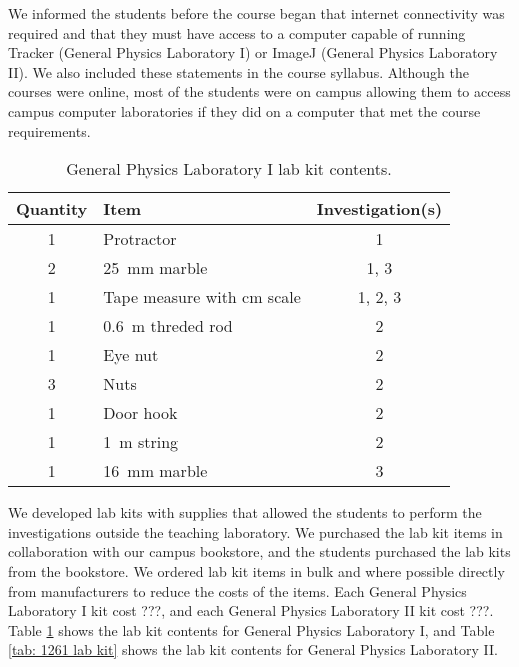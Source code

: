 \documentclass[aip, numerical, preprint]{revtex4-2}
\begin{document}
We informed the students before the course began that internet connectivity was required and that they must have access to a computer capable of running Tracker (General Physics Laboratory I) or ImageJ (General Physics Laboratory II). We also included these statements in the course syllabus. Although the courses were online, most of the students were on campus allowing them to access campus computer laboratories if they did on a computer that met the course requirements.
  
 \begin{table}
    \caption{\label{tab: 1251 lab kit} General Physics Laboratory I lab kit contents.}
        \begin{tabular}{clc}
            \hline\hline
            Quantity & Item & Investigation(s)\\
            \hline
            1 & Protractor & 1 \\
            2 & \SI{25}{mm} marble & 1, 3 \\
            1 & Tape measure with cm scale & 1, 2, 3\\
            1 & \SI{0.6}{m} threded rod & 2 \\
            1 & Eye nut & 2 \\
            3 & Nuts & 2 \\
            1 & Door hook & 2 \\
            1 & \SI{1}{m} string & 2 \\
            1 & \SI{16}{mm} marble & 3 \\
            \hline\hline
        \end{tabular}
\end{table}

We developed lab kits with supplies that allowed the students to perform the investigations outside the teaching laboratory. We purchased the lab kit items in collaboration with our campus bookstore, and the students purchased the lab kits from the bookstore. We ordered lab kit items in bulk and where possible directly from manufacturers to reduce the costs of the items. Each General Physics Laboratory I kit cost ???, and each General Physics Laboratory II kit cost ???. Table \ref{tab: 1251 lab kit} shows the lab kit contents for General Physics Laboratory I, and Table \ref{tab: 1261 lab kit} shows the lab kit contents for General Physics Laboratory II.
\end{document}

